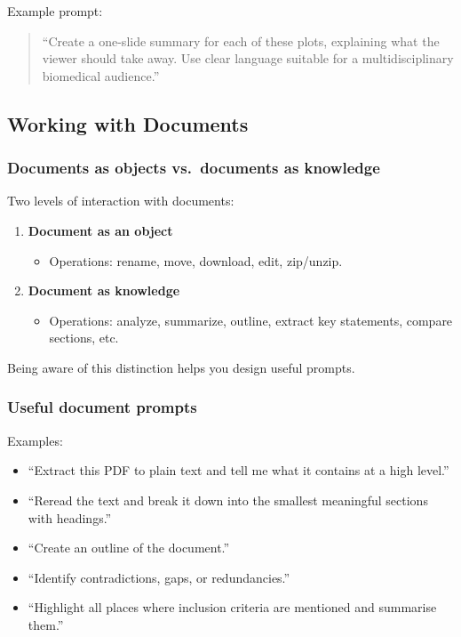 \documentclass[
  letterpaper,
  DIV=11,
  numbers=noendperiod]{scrreprt}
\providecommand{\tightlist}{%
  \setlength{\itemsep}{0pt}\setlength{\parskip}{0pt}}
\begin{document}
Example prompt:

\begin{quote}
``Create a one-slide summary for each of these plots, explaining what
the viewer should take away. Use clear language suitable for a
multidisciplinary biomedical audience.''
\end{quote}

\subsection{Working with Documents}\label{working-with-documents}

\subsubsection{Documents as objects vs.~documents as
knowledge}\label{documents-as-objects-vs.-documents-as-knowledge}

Two levels of interaction with documents:

\begin{enumerate}
\def\labelenumi{\arabic{enumi}.}
\tightlist
\item
  \textbf{Document as an object}

  \begin{itemize}
  \tightlist
  \item
    Operations: rename, move, download, edit, zip/unzip.
  \end{itemize}
\item
  \textbf{Document as knowledge}

  \begin{itemize}
  \tightlist
  \item
    Operations: analyze, summarize, outline, extract key statements,
    compare sections, etc.
  \end{itemize}
\end{enumerate}

Being aware of this distinction helps you design useful prompts.

\subsubsection{Useful document prompts}\label{useful-document-prompts}

Examples:

\begin{itemize}
\tightlist
\item
  ``Extract this PDF to plain text and tell me what it contains at a
  high level.''
\item
  ``Reread the text and break it down into the smallest meaningful
  sections with headings.''
\item
  ``Create an outline of the document.''
\item
  ``Identify contradictions, gaps, or redundancies.''
\item
  ``Highlight all places where inclusion criteria are mentioned and
  summarise them.''
\end{itemize}
\end{document}

